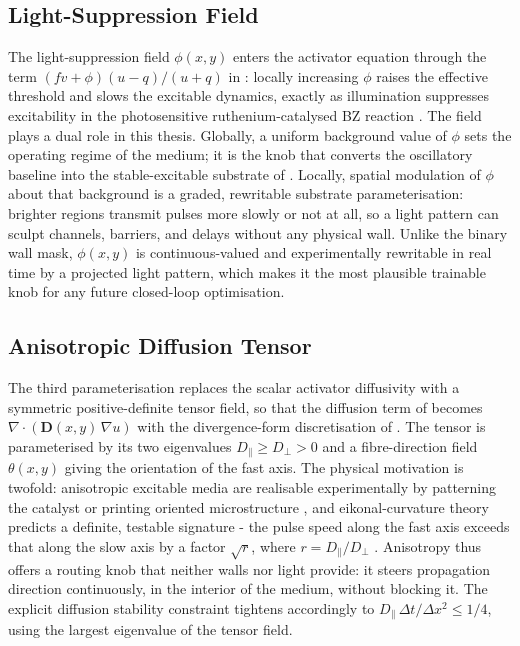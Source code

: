 \subsection{Light-Suppression Field}
\label{sec:meth_light}

The light-suppression field $\phi(x,y)$ enters the activator equation through the term $(f v + \phi)(u-q)/(u+q)$ in : locally increasing $\phi$ raises the effective threshold and slows the excitable dynamics, exactly as illumination suppresses excitability in the photosensitive ruthenium-catalysed BZ reaction \cite{sakurai2002design}.
The field plays a dual role in this thesis.
Globally, a uniform background value of $\phi$ sets the operating regime of the medium; it is the knob that converts the oscillatory baseline into the stable-excitable substrate of .
Locally, spatial modulation of $\phi$ about that background is a graded, rewritable substrate parameterisation: brighter regions transmit pulses more slowly or not at all, so a light pattern can sculpt channels, barriers, and delays without any physical wall.
Unlike the binary wall mask, $\phi(x,y)$ is continuous-valued and experimentally rewritable in real time by a projected light pattern, which makes it the most plausible trainable knob for any future closed-loop optimisation.

\subsection{Anisotropic Diffusion Tensor}
\label{sec:meth_anisotropy}

The third parameterisation replaces the scalar activator diffusivity with a symmetric positive-definite tensor field, so that the diffusion term of  becomes $\nabla\!\cdot\!(\mathbf{D}(x,y)\,\nabla u)$ with the divergence-form discretisation of .
The tensor is parameterised by its two eigenvalues $D_{\parallel} \geq D_{\perp} > 0$ and a fibre-direction field $\theta(x,y)$ giving the orientation of the fast axis.
The physical motivation is twofold: anisotropic excitable media are realisable experimentally by patterning the catalyst or printing oriented microstructure \cite{steinbock1995anisotropy}, and eikonal-curvature theory predicts a definite, testable signature - the pulse speed along the fast axis exceeds that along the slow axis by a factor $\sqrt{r}$, where $r = D_{\parallel}/D_{\perp}$ \cite{keener1991eikonal}.
Anisotropy thus offers a routing knob that neither walls nor light provide: it steers propagation direction continuously, in the interior of the medium, without blocking it.
The explicit diffusion stability constraint tightens accordingly to $D_{\parallel}\,\Delta t/\Delta x^{2} \leq 1/4$, using the largest eigenvalue of the tensor field.

